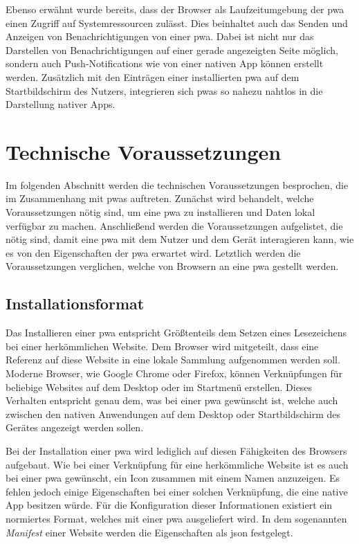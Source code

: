 \documentclass[12pt, parskip=half]{scrartcl}       %
\begin{document}
Ebenso erwähnt wurde bereits, dass der Browser als Laufzeitumgebung der \ac{pwa} einen Zugriff auf Systemressourcen zulässt.
Dies beinhaltet auch das Senden und Anzeigen von Benachrichtigungen von einer \ac{pwa}.
Dabei ist nicht nur das Darstellen von Benachrichtigungen auf einer gerade angezeigten Seite möglich, sondern auch Push-Notifications wie von einer nativen App können erstellt werden.
Zusätzlich mit den Einträgen einer installierten \ac{pwa} auf dem Startbildschirm des Nutzers, integrieren sich \acp{pwa} so nahezu nahtlos in die Darstellung nativer Apps.


\section{Technische Voraussetzungen}
\label{sec:voraussetzung}

Im folgenden Abschnitt werden die technischen Voraussetzungen besprochen, die im Zusammenhang mit \acp{pwa} auftreten.
Zunächst wird behandelt, welche Voraussetzungen nötig sind, um eine \ac{pwa} zu installieren und Daten lokal verfügbar zu machen.
Anschließend werden die Voraussetzungen aufgelistet, die nötig sind, damit eine \ac{pwa} mit dem Nutzer und dem Gerät interagieren kann, wie es von den Eigenschaften der \ac{pwa} erwartet wird.
Letztlich werden die Voraussetzungen verglichen, welche von Browsern an eine \ac{pwa} gestellt werden.

\subsection{Installationsformat}

Das Installieren einer \ac{pwa} entspricht Größtenteils dem Setzen eines Lesezeichens bei einer herkömmlichen Website.
Dem Browser wird mitgeteilt, dass eine Referenz auf diese Website in eine lokale Sammlung aufgenommen werden soll.
Moderne Browser, wie Google Chrome oder Firefox, können Verknüpfungen für beliebige Websites auf dem Desktop oder im Startmenü erstellen\cite{mozillasupport_desktopshortcut}\cite{businessinsider_desktopshortcut_chrome}.
Dieses Verhalten entspricht genau dem, was bei einer \ac{pwa} gewünscht ist, welche auch zwischen den nativen Anwendungen auf dem Desktop oder Startbildschirm des Gerätes angezeigt werden sollen.

Bei der Installation einer \ac{pwa} wird lediglich auf diesen Fähigkeiten des Browsers aufgebaut.
Wie bei einer Verknüpfung für eine herkömmliche Website ist es auch bei einer \ac{pwa} gewünscht, ein Icon zusammen mit einem Namen anzuzeigen.
Es fehlen jedoch einige Eigenschaften bei einer solchen Verknüpfung, die eine native App besitzen würde.
Für die Konfiguration dieser Informationen existiert ein normiertes Format, welches mit einer \ac{pwa} ausgeliefert wird.
In dem sogenannten \textit{Manifest} einer Website werden die Eigenschaften als \ac{json} festgelegt.
\end{document}
